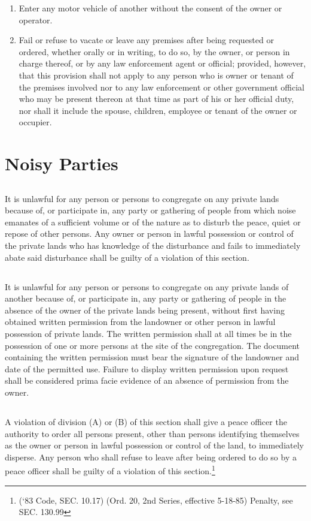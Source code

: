 \begin{enumerate}[{\indent}A)]
    \item Enter any motor vehicle of another without the consent of the owner or operator.
    \item Fail or refuse to vacate or leave any premises after being requested or ordered, whether orally or in writing, to do so, by the owner, or person in charge thereof, or by any law enforcement agent or official; provided, however, that this provision shall not apply to any person who is owner or tenant of the premises involved nor to any law enforcement or other government official who may be present thereon at that time as part of his or her official duty, nor shall it include the spouse, children, employee or tenant of the owner or occupier.
\end{enumerate}

\section{Noisy Parties}
\subsection{}
It is unlawful for any person or persons to congregate on any private lands because of, or participate in, any party or gathering of people from which noise emanates of a sufficient volume or of the nature as to disturb the peace, quiet or repose of other persons. Any owner or person in lawful possession or control of the private lands who has knowledge of the disturbance and fails to immediately abate said disturbance shall be guilty of a violation of this section.
\subsection{}
It is unlawful for any person or persons to congregate on any private lands of another because of, or participate in, any party or gathering of people in the absence of the owner of the private lands being present, without first having obtained written permission from the landowner or other person in lawful possession of private lands. The written permission shall at all times be in the possession of one or more persons at the site of the congregation. The document containing the written permission must bear the signature of the landowner and date of the permitted use. Failure to display written permission upon request shall be considered prima facie evidence of an absence of permission from the owner.
\subsection{}
A violation of division (A) or (B) of this section shall give a peace officer the authority to order all persons present, other than persons identifying themselves as the owner or person in lawful possession or control of the land, to immediately disperse. Any person who shall refuse to leave after being ordered to do so by a peace officer shall be guilty of a violation of this section.\footnote{(‘83 Code, SEC. 10.17)  (Ord. 20, 2nd Series, effective 5-18-85)  Penalty, see SEC. 130.99}

